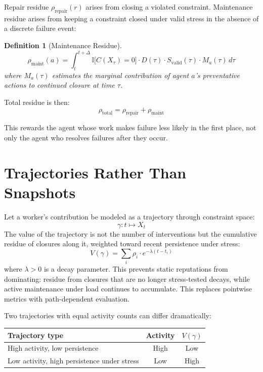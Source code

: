\documentclass[12pt]{article}
\newtheorem{definition}{Definition}
\begin{document}
Repair residue $\rho_{\mathrm{repair}}(r)$ arises from closing a
violated constraint. Maintenance residue arises from keeping a
constraint closed under valid stress in the absence of a discrete
failure event:

\begin{definition}[Maintenance Residue]
\[
  \rho_{\mathrm{maint}}(a) =
    \int_{t}^{t+\Delta}
      \mathbb{I}\bigl[C(X_\tau) = 0\bigr]
      \cdot D(\tau)
      \cdot S_{\mathrm{valid}}(\tau)
      \cdot M_a(\tau)
    \, d\tau
\]
where $M_a(\tau)$ estimates the marginal contribution of agent $a$'s
preventative actions to continued closure at time $\tau$.
\end{definition}

Total residue is then:
\[
  \rho_{\mathrm{total}} = \rho_{\mathrm{repair}} + \rho_{\mathrm{maint}}
\]

This rewards the agent whose work makes failure less likely in the first
place, not only the agent who resolves failures after they occur.

\section{Trajectories Rather Than Snapshots}

Let a worker's contribution be modeled as a trajectory through
constraint space:
\[
  \gamma : t \mapsto X_t
\]
The value of the trajectory is not the number of interventions but the
cumulative residue of closures along it, weighted toward recent
persistence under stress:
\[
  V(\gamma) = \sum_i \rho_i \cdot e^{-\lambda(t - t_i)}
\]
where $\lambda > 0$ is a decay parameter. This prevents static
reputations from dominating: residue from closures that are no longer
stress-tested decays, while active maintenance under load continues to
accumulate. This replaces pointwise metrics with path-dependent
evaluation.

Two trajectories with equal activity counts can differ dramatically:

\medskip
\begin{center}
\begin{tabular}{lcc}
\toprule
Trajectory type & Activity & $V(\gamma)$ \\
\midrule
High activity, low persistence & High & Low \\
Low activity, high persistence under stress & Low & High \\
\bottomrule
\end{tabular}
\end{center}
\medskip
\end{document}
